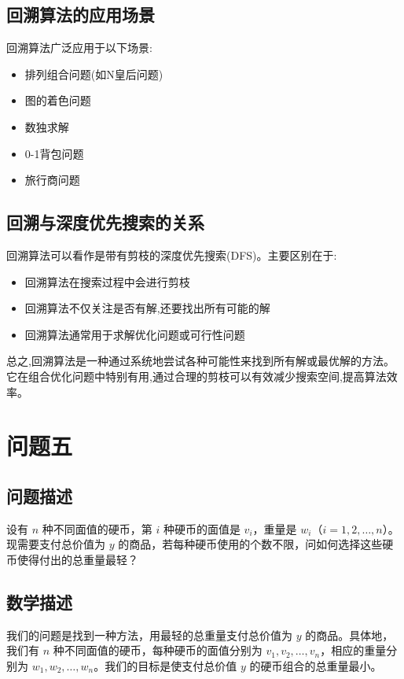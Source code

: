 \documentclass[12pt]{article}
\begin{document}
\subsection{回溯算法的应用场景}

回溯算法广泛应用于以下场景:
\begin{itemize}
\item 排列组合问题(如N皇后问题)
\item 图的着色问题
\item 数独求解
\item 0-1背包问题
\item 旅行商问题
\end{itemize}

\subsection{回溯与深度优先搜索的关系}

回溯算法可以看作是带有剪枝的深度优先搜索(DFS)。主要区别在于:
\begin{itemize}
\item 回溯算法在搜索过程中会进行剪枝
\item 回溯算法不仅关注是否有解,还要找出所有可能的解
\item 回溯算法通常用于求解优化问题或可行性问题
\end{itemize}

总之,回溯算法是一种通过系统地尝试各种可能性来找到所有解或最优解的方法。它在组合优化问题中特别有用,通过合理的剪枝可以有效减少搜索空间,提高算法效率。
\section{问题五}
\subsection{问题描述}
设有 $n$ 种不同面值的硬币，第 $i$ 种硬币的面值是 $v_i$，重量是 $w_i$（$i=1,2,\ldots,n$）。现需要支付总价值为 $y$ 的商品，若每种硬币使用的个数不限，问如何选择这些硬币使得付出的总重量最轻？

\subsection{数学描述}
我们的问题是找到一种方法，用最轻的总重量支付总价值为 $y$ 的商品。具体地，我们有 $n$ 种不同面值的硬币，每种硬币的面值分别为 $v_1, v_2, \ldots, v_n$，相应的重量分别为 $w_1, w_2, \ldots, w_n$。我们的目标是使支付总价值 $y$ 的硬币组合的总重量最小。
\end{document}
